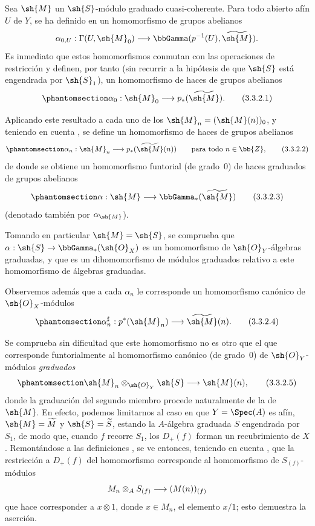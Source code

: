 \documentclass[oneside,10pt]{amsart}
\makeatletter
\newcommand{\ega@arrow}[2]{\mathchoice{#1}{#2}{#2}{#2}}
\renewcommand{\to}{\ega@arrow{\longrightarrow}{\rightarrow}}
\newcommand{\oldpage}[2][]{\marginnote{\normalfont\footnotesize\textbf{#1}~|~#2}\ignorespaces}
\let\EGAOriginalLabel\label
\renewcommand{\label}[1]{\phantomsection\EGAOriginalLabel{#1}}
\makeatother
\begin{document}
\begin{env}[3.3.2]
\label{II.3.3.2}
Sea $\sh{M}$ un $\sh{S}$-módulo graduado cuasi-coherente.
Para todo abierto afín $U$ de $Y$, se ha definido en  un homomorfismo de grupos abelianos
\[
  \alpha_{0,U}:\Gamma(U,\sh{M}_0)
  \to\bbGamma(p^{-1}(U),\widetilde{\sh{M}}).
\]
Es inmediato que estos homomorfismos conmutan con las operaciones de restricción  y definen, por tanto (sin recurrir a la hipótesis de que $\sh{S}$ está engendrada por $\sh{S}_1$), un homomorfismo de haces de grupos abelianos
\[
\label{II.3.3.2.1}
  \alpha_0:\sh{M}_0\to p_*(\widetilde{\sh{M}}).
\tag{3.3.2.1}
\]

Aplicando este resultado a cada uno de los $\sh{M}_n=(\sh{M}(n))_0$, y teniendo en cuenta , se define un homomorfismo de haces de grupos abelianos
\[
\label{II.3.3.2.2}
  \alpha_n:\sh{M}_n\to p_*(\widetilde{\sh{M}}(n))
  \qquad\text{para todo }n\in\bb{Z},
\tag{3.3.2.2}
\]
de donde se obtiene un homomorfismo funtorial (de grado~$0$) de haces graduados de grupos abelianos
\[
\label{II.3.3.2.3}
  \alpha:\sh{M}\to\bbGamma_*(\widetilde{\sh{M}})
\tag{3.3.2.3}
\]
(denotado también por $\alpha_{\sh{M}}$).

Tomando en particular $\sh{M}=\sh{S}$, se comprueba que $\alpha:\sh{S}\to\bbGamma_*(\sh{O}_X)$ es un homomorfismo de $\sh{O}_Y$-álgebras graduadas, y que  es un dihomomorfismo de módulos graduados relativo a este homomorfismo de álgebras graduadas.

Observemos además que a cada $\alpha_n$ le corresponde  un homomorfismo canónico de $\sh{O}_X$-módulos
\[
\label{II.3.3.2.4}
  \alpha_n^\sharp:p^*(\sh{M}_n)\to\widetilde{\sh{M}}(n).
\tag{3.3.2.4}
\]

Se comprueba sin dificultad que este homomorfismo no es otro que el que corresponde funtorialmente  al homomorfismo canónico (de grado~$0$) de $\sh{O}_Y$-módulos \emph{graduados}
\[
\label{II.3.3.2.5}
  \sh{M}_n\otimes_{\sh{O}_Y}\sh{S}\to\sh{M}(n),
\tag{3.3.2.5}
\]
\oldpage[II]{58}
donde la graduación del segundo miembro procede naturalmente de la de $\sh{M}$.
En efecto, podemos limitarnos al caso en que $Y=\Spec(A)$ es afín, $\sh{M}=\widetilde{M}$ y $\sh{S}=\widetilde{S}$, estando la $A$-álgebra graduada $S$ engendrada por $S_1$, de modo que, cuando $f$ recorre $S_1$, los $D_+(f)$ forman un recubrimiento de $X$.
Remontándose a las definiciones , se ve entonces, teniendo en cuenta , que la restricción a $D_+(f)$ del homomorfismo  corresponde  al homomorfismo de $S_{(f)}$-módulos
\[
  M_n\otimes_A S_{(f)}\to(M(n))_{(f)}
\]
que hace corresponder a $x\otimes1$, donde $x\in M_n$, el elemento $x/1$; esto demuestra la aserción.
\end{env}
\end{document}
